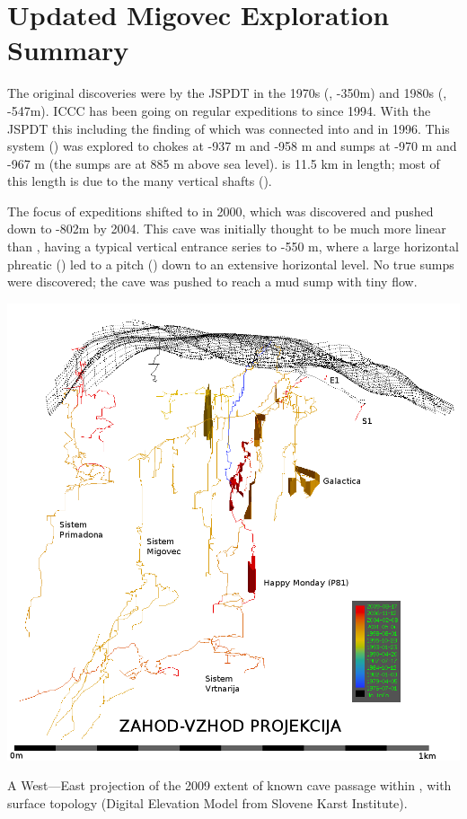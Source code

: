 \section{Updated Migovec Exploration Summary}

The original  discoveries were by the JSPDT in the 1970s (,
-350m) and 1980s (, -547m). ICCC has been going on regular expeditions
to  since 1994. With the JSPDT this including the finding of
 which was connected into  and  in 1996. This system ()
was explored to chokes at -937 m and -958 m and sumps at -970 m and -967 m (the sumps are at 885 m above sea level).  is 11.5 km
in length; most of this length is due to the many vertical shafts ().

The focus of expeditions shifted to  in 2000, which was discovered
and pushed down to -802m by 2004. This cave was initially thought to be much more linear than , having a typical vertical entrance
series to -550 m, where a large horizontal phreatic () led to a pitch () down to an extensive horizontal level. No true sumps were discovered; the cave was pushed to reach a mud sump with tiny flow.

\begin{center}
\begin{pagefigure}
\centering
\includegraphics[width=0.75\columnwidth]{2010/mig_background2010/mig_2009_for_jamar.png}
\caption{A West---East projection of the 2009 extent of known cave passage within , with surface topology
(Digital Elevation Model from Slovene Karst Institute).}
\end{pagefigure}
\end{center}

